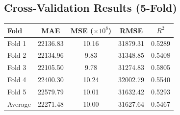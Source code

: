 \documentclass[12pt]{article}
\begin{document}
\subsection*{Cross-Validation Results (5-Fold)}
\begin{tabular}{lcccc}
\toprule
Fold & MAE & MSE ($\times 10^8$) & RMSE & $R^2$ \\
\midrule
Fold 1 & 22136.83 & 10.16 & 31879.31 & 0.5289 \\
Fold 2 & 22134.96 & 9.83 & 31348.85 & 0.5408 \\
Fold 3 & 22105.50 & 9.78 & 31274.83 & 0.5805 \\
Fold 4 & 22400.30 & 10.24 & 32002.79 & 0.5540 \\
Fold 5 & 22579.79 & 10.01 & 31632.42 & 0.5293 \\
\midrule
Average & 22271.48 & 10.00 & 31627.64 & 0.5467 \\
\bottomrule
\end{tabular}
\end{document}
